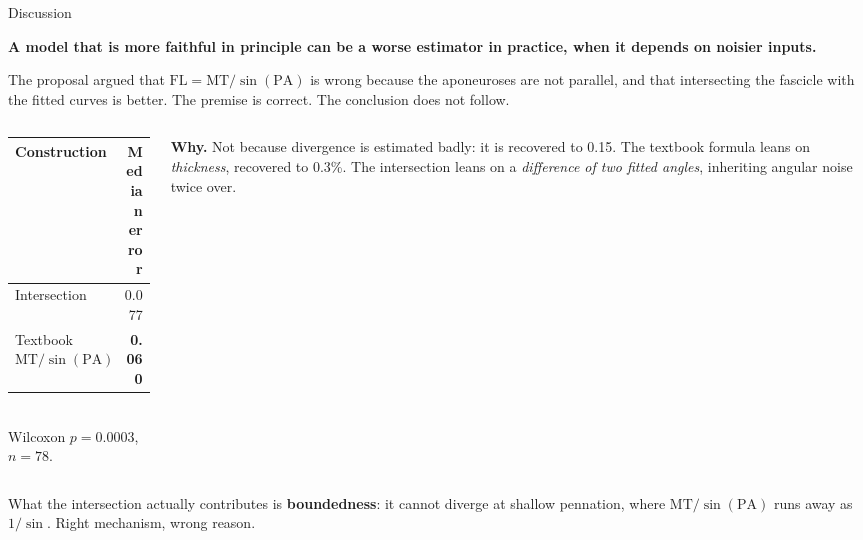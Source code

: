 \documentclass[aspectratio=169,11pt]{beamer}
\newcommand{\hl}[1]{\textcolor{Accent}{\textbf{#1}}}
\begin{document}
\begin{frame}{Discussion}
  \begin{center}
  \colorbox{Accent!14}{\parbox{0.93\textwidth}{\centering
  \textbf{A model that is more faithful in principle can be a worse estimator
  in practice, when it depends on noisier inputs.}}}
  \end{center}
  \vspace{0.3cm}

  {\small The proposal argued that $\mathrm{FL} = \mathrm{MT}/\sin(\mathrm{PA})$
  is wrong because the aponeuroses are not parallel, and that intersecting the
  fascicle with the fitted curves is better. The premise is correct. The
  conclusion does not follow.}
  \vspace{0.25cm}

  \begin{columns}[T]
  \begin{column}{0.47\textwidth}
    {\footnotesize
    \begin{tabular}{lr}
      \toprule
      \textbf{Construction} & \textbf{Median error} \\
      \midrule
      Intersection & 0.077 \\
      Textbook $\mathrm{MT}/\sin(\mathrm{PA})$ & \textbf{0.060} \\
      \bottomrule
    \end{tabular}\\[0.15cm]
    Wilcoxon $p = 0.0003$, $n = 78$.}
  \end{column}
  \begin{column}{0.5\textwidth}
    {\footnotesize \textbf{Why.} Not because divergence is estimated badly: it
    is recovered to 0.15\textdegree. The textbook formula leans on
    \emph{thickness}, recovered to 0.3\%. The intersection leans on a
    \emph{difference of two fitted angles}, inheriting angular noise twice over.}
  \end{column}
  \end{columns}
  \vspace{0.25cm}

  {\footnotesize What the intersection actually contributes is
  \hl{boundedness}: it cannot diverge at shallow pennation, where
  $\mathrm{MT}/\sin(\mathrm{PA})$ runs away as $1/\sin$. Right mechanism, wrong
  reason.}
\end{frame}
\end{document}
